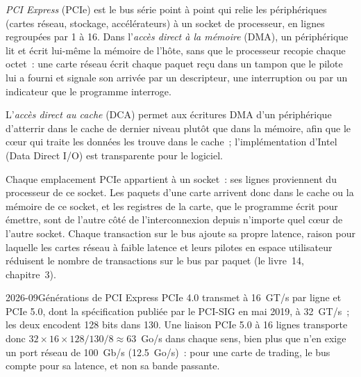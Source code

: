 \begin{definition}\label{def:ll:multi-socket-machines-and-interconnects:pcie}
\emph{PCI Express} (PCIe) est le bus série point à point qui relie les périphériques (cartes réseau,
stockage, accélérateurs) à un socket de processeur, en lignes regroupées par 1 à 16.
Dans l'\emph{accès direct à la mémoire} (DMA), un périphérique lit et écrit lui-même la mémoire de l'hôte, sans que le processeur recopie chaque octet~: une carte réseau
écrit chaque paquet reçu dans un tampon que le pilote lui a fourni et signale son arrivée par un descripteur, une interruption
ou par un indicateur que le programme interroge.
\end{definition}

\begin{definition}\label{def:ll:multi-socket-machines-and-interconnects:dca}
L'\emph{accès direct au cache} (DCA) permet aux écritures DMA d'un périphérique d'atterrir dans le cache de dernier niveau
plutôt que dans la mémoire, afin que le cœur qui traite les données les trouve dans le cache~; l'implémentation d'Intel (Data Direct I/O)
est transparente pour le logiciel.
\end{definition}

Chaque emplacement PCIe appartient à un socket~: ses lignes proviennent du processeur de ce socket. Les paquets d'une carte arrivent donc dans
le cache ou la mémoire de ce socket, et les registres de la carte, que le programme écrit pour émettre, sont de l'autre côté de l'interconnexion
depuis n'importe quel cœur de l'autre socket. Chaque transaction sur le bus ajoute sa propre latence, raison pour laquelle les cartes réseau à faible latence et leurs pilotes en espace utilisateur
réduisent le nombre de transactions sur le bus par paquet (le livre~14, chapitre~3).

\begin{dated}{2026-09}{Générations de PCI Express}\label{dat:ll:multi-socket-machines-and-interconnects:pcie}
PCIe 4.0 transmet à 16~GT/s par ligne et PCIe 5.0, dont la spécification publiée par le PCI-SIG en mai 2019, à 32~GT/s~; les deux
encodent 128 bits dans 130. Une liaison PCIe 5.0 à 16 lignes transporte donc $32 \times 16 \times 128/130/8 \approx 63$~Go/s dans chaque
sens, bien plus que n'en exige un port réseau de 100~Gb/s (12.5~Go/s)~: pour une carte de trading, le bus compte pour sa latence,
et non sa bande passante.
\end{dated}

